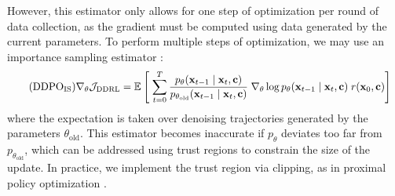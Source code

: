 However, this estimator only allows for one step of optimization per round of data collection, as the gradient must be computed using data generated by the current parameters.
To perform multiple steps of optimization, we may use an importance sampling estimator \citep{kakade2002approximately}:
\begin{align}
    \tag{\methodppo}
    \nabla_\theta \mathcal{J}_\text{DDRL} &= \expect{}{\; \sum_{t=0}^{T} \frac{p_\theta (\bx_{t-1} \mid \bx_t, \bc)}{p_{\theta_\text{old}} (\bx_{t-1} \mid \bx_t, \bc)} \; \nabla_\theta \log p_\theta(\bx_{t-1} \mid \bx_t, \bc) \; r(\bx_0, \bc)}
    \label{eq:is_pg}
\end{align}
where the expectation is taken over denoising trajectories generated by the parameters $\theta_\text{old}$.
This estimator becomes inaccurate if $p_\theta$ deviates too far from $p_{\theta_\text{old}}$, which can be addressed using trust regions \citep{schulman2015trpo} to constrain the size of the update.
In practice, we implement the trust region via clipping, as in proximal policy optimization \citep{schulman2017ppo}.